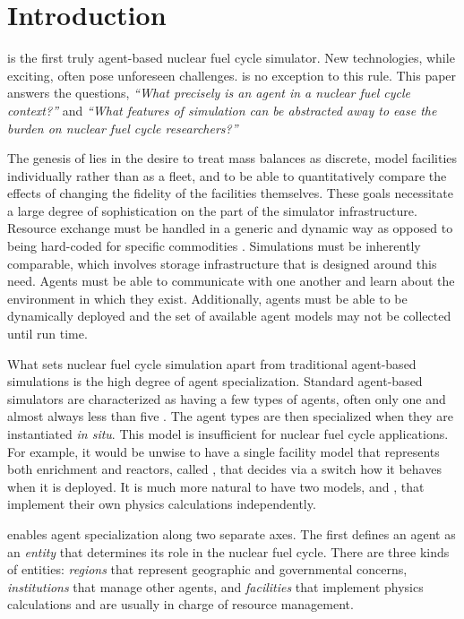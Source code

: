 \section{Introduction}
\label{sec-intro}

\Cyclus \cite{cyclus_v1_0,cyclus_v1_2,huff_fundamental_2016} is the first truly agent-based
\cite{jennings2000agent} nuclear fuel cycle simulator.
New technologies, while exciting, often pose unforeseen challenges.
\Cyclus is no exception to this rule.  This paper answers the questions,
\emph{``What precisely is an agent in a nuclear fuel cycle context?''} and
\emph{``What features of simulation can be abstracted away to ease the burden
on nuclear fuel cycle researchers?''}

The genesis of \cyclus lies in the desire to
treat mass balances as discrete, model facilities individually rather than as
a fleet, and to be able to quantitatively compare the effects of changing the
fidelity of the facilities themselves. These goals necessitate a large degree of
sophistication on the part of the simulator infrastructure.  Resource exchange
must be handled in a generic and dynamic way as opposed to being hard-coded
for specific commodities \cite{Gidden2016}. Simulations must be inherently comparable, which involves
storage infrastructure that is designed around this need. Agents must be able
to communicate with one another and learn about the environment in which they
exist. Additionally, agents must be able to be dynamically deployed and the set of
available agent models may not be collected until run time.

What sets nuclear fuel cycle simulation apart from traditional agent-based simulations
is the high degree of agent specialization. Standard agent-based simulators
are characterized as having a few types of agents, often only one and
almost always less than five \cite{taylor2014agent}. The agent types are then
specialized
when they are instantiated \emph{in situ}. This model is insufficient for
nuclear fuel cycle applications.  For example, it would be unwise to have a single facility model
that represents both enrichment and reactors, called ,
that decides via a switch how it behaves when it is deployed. It is much
more natural to have two models,  and ,
that implement their own physics calculations independently.

\Cyclus enables agent specialization along two separate axes. The first defines
an agent as an \emph{entity} that determines its role in the
nuclear fuel cycle. There are three kinds of entities: \emph{regions} that
represent geographic and governmental concerns, \emph{institutions}
that manage other agents, and \emph{facilities} that implement
physics calculations and are usually in charge of resource management.

